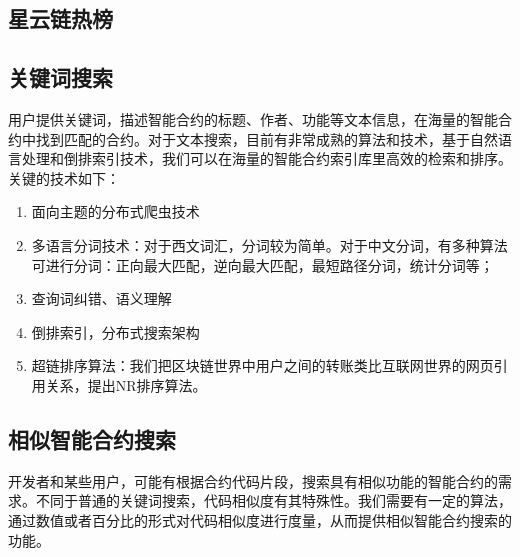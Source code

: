 \subsection{星云链热榜}

\subsection{关键词搜索}
用户提供关键词，描述智能合约的标题、作者、功能等文本信息，在海量的智能合约中找到匹配的合约。对于文本搜索，目前有非常成熟的算法和技术，基于自然语言处理和倒排索引技术，我们可以在海量的智能合约索引库里高效的检索和排序。关键的技术如下：
\begin{enumerate}
	\item 面向主题的分布式爬虫技术
	\item 多语言分词技术：对于西文词汇，分词较为简单。对于中文分词，有多种算法可进行分词：正向最大匹配，逆向最大匹配，最短路径分词，统计分词等；
	\item 查询词纠错、语义理解
	\item 倒排索引，分布式搜索架构
	\item 超链排序算法：我们把区块链世界中用户之间的转账类比互联网世界的网页引用关系，提出NR排序算法。
\end{enumerate}


\subsection{相似智能合约搜索}
开发者和某些用户，可能有根据合约代码片段，搜索具有相似功能的智能合约的需求。不同于普通的关键词搜索，代码相似度有其特殊性。我们需要有一定的算法，通过数值或者百分比的形式对代码相似度进行度量，从而提供相似智能合约搜索的功能。

